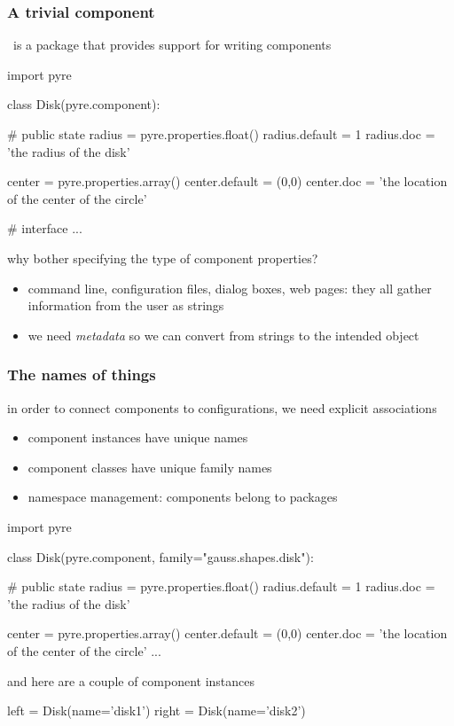 \begin{frame}[fragile]
%
  \frametitle{A trivial component}
%
  \pyre\ is a package that provides support for writing components
%
  \begin{ipython}{}
import pyre

class Disk(pyre.component):

    # public state
    radius = pyre.properties.float()
    radius.default = 1
    radius.doc = 'the radius of the disk'

    center = pyre.properties.array()
    center.default = (0,0)
    center.doc = 'the location of the center of the circle'

    # interface
    ...
  \end{ipython}
%
  why bother specifying the type of component properties?
  \begin{itemize}
  \item command line, configuration files, dialog boxes, web pages: they all gather information
    from the user as strings
  \item we need \emph{metadata} so we can convert from strings to the intended object
  \end{itemize}
%
\end{frame}

\begin{frame}[fragile]
%
  \frametitle{The names of things}
%
  in order to connect components to configurations, we need explicit associations
  \begin{itemize}
  \item component instances have unique names
  \item component classes have unique family names
  \item namespace management: components belong to packages
  \end{itemize}
%
  \begin{ipython}{}
import pyre

class Disk(pyre.component, family="gauss.shapes.disk"):

    # public state
    radius = pyre.properties.float()
    radius.default = 1
    radius.doc = 'the radius of the disk'

    center = pyre.properties.array()
    center.default = (0,0)
    center.doc = 'the location of the center of the circle'
    ...
  \end{ipython}
%
  and here are a couple of component instances
%
  \begin{ipython}{}
left = Disk(name='disk1')
right = Disk(name='disk2')
  \end{ipython}
\end{frame}

